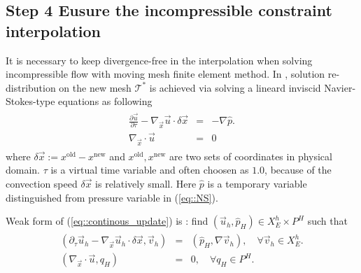 \documentclass{eajam}
\begin{document}
   \subsection{Step 4 Eusure the incompressible constraint interpolation}
      It is necessary to keep divergence-free in the interpolation
      when solving incompressible flow with moving mesh finite element
      method. In \cite{di2005moving}, solution re-distribution on the new 
      mesh $\mathcal{T}^*$ is achieved via solving a lineard inviscid 
      Navier-Stokes-type equations as following
      \begin{eqnarray}
        \begin{aligned}
          \frac{\partial \vec{u}}{\partial \tau} - \nabla_{\vec{x}}\vec{u}
          \cdot \delta \vec{x} & = & - \nabla \hat{p}. \\
          \nabla_{\vec{x}}\cdot \vec{u} & = & 0
        \end{aligned}
        \label{eq::continous_update}
      \end{eqnarray} 
      where $\delta \vec{x} := x^{\text{old}} - x^{\text{new}}$ and 
      $x^{\text{old}}, x^{\text{new}}$ are two sets of coordinates in
      physical domain. $\tau$ is a virtual time variable and often
      choosen as $1.0$, because of the convection speed $\delta \vec{x}$
      is relatively small. Here $\hat{p}$ is a temporary variable
      distinguished from pressure variable in (\ref{eq::NS}). 

      Weak form of (\ref{eq::continous_update}) is : find $(\vec{u}_h,
      \hat{p}_H) \in X_E^h \times P^H$ such that 
      \begin{eqnarray}
        \begin{aligned}
          \left( \partial_{\tau} \vec{u}_h - \nabla_{\vec{x}}\vec{u}_h
            \cdot \delta \vec{x}, \vec{v}_h \right) & = & \left( \hat{p}_H, \nabla
            \vec{v}_h \right), \quad \forall \vec{v}_h \in X_E^h. \\
          \left( \nabla_{\vec{x}} \cdot \vec{u}, q_H\right) & = & 0, \quad \forall
          q_H \in P^H.
        \end{aligned}
        \label{eq::semi_discreted_update}
      \end{eqnarray}
      
\end{document}
